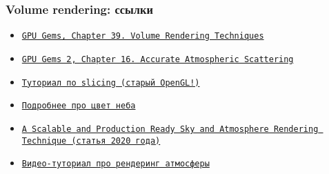 \documentclass[10pt]{beamer}
\begin{document}
\begin{frame}[fragile]
\frametitle{Volume rendering: ссылки}
\begin{itemize}
\item \href{https://developer.nvidia.com/gpugems/gpugems/part-vi-beyond-triangles/chapter-39-volume-rendering-techniques}{\texttt{GPU Gems, Chapter 39. Volume Rendering Techniques}}
\item \href{https://developer.nvidia.com/gpugems/gpugems2/part-ii-shading-lighting-and-shadows/chapter-16-accurate-atmospheric-scattering}{\texttt{GPU Gems 2, Chapter 16. Accurate Atmospheric Scattering}}
\item \href{https://www.codeproject.com/Articles/352270/Getting-Started-with-Volume-Rendering-using-OpenGL}{\texttt{Туториал по slicing (старый OpenGL!)}}
\item \href{https://www.scratchapixel.com/lessons/procedural-generation-virtual-worlds/simulating-sky/simulating-colors-of-the-sky}{\texttt{Подробнее про цвет неба}}
\item \href{https://sebh.github.io/publications/egsr2020.pdf}{\texttt{A Scalable and Production Ready Sky and Atmosphere Rendering Technique (статья 2020 года)}}
\item \href{https://www.youtube.com/watch?v=DxfEbulyFcY}{\texttt{Видео-туториал про рендеринг атмосферы}}
\end{itemize}
\end{frame}
\end{document}
